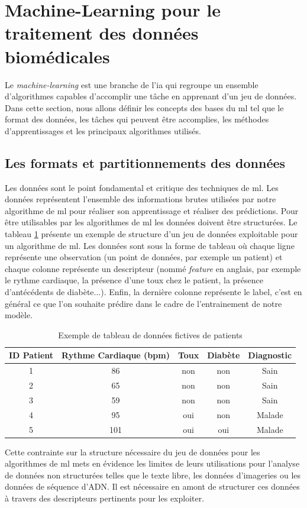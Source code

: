 \section{Machine-Learning pour le traitement des données biomédicales}
Le \textit{machine-learning} est une branche de l'\gls{ia} qui regroupe un ensemble d'algorithmes capables d'accomplir une tâche en apprenant d'un jeu de données. Dans cette section, nous allons définir les concepts des bases du \gls{ml} tel que le format des données, les tâches qui peuvent être accomplies, les méthodes d'apprentissages et les principaux algorithmes utilisés.

\subsection{Les formats et partitionnements des données}
Les données sont le point fondamental et critique des techniques de \gls{ml}. Les données représentent l'ensemble des informations brutes utilisées par notre algorithme de \gls{ml} pour réaliser son apprentissage et réaliser des prédictions. Pour être utilisables par les algorithmes de \gls{ml} les données doivent être structurées. Le tableau \ref{table:dataset_intro} présente un exemple de structure d'un jeu de données exploitable pour un algorithme de \gls{ml}. Les données sont sous la forme de tableau où chaque ligne représente une observation (un point de données, par exemple un patient) et chaque colonne représente un descripteur (nommé \textit{feature} en anglais, par exemple le rythme cardiaque, la présence d'une toux chez le patient, la présence d'antécédents de diabète...). Enfin, la dernière colonne représente le label, c'est en général ce que l'on souhaite prédire dans le cadre de l'entrainement de notre modèle.
\begin{table}[!htbp]
\centering
\begin{tabular}{|c|c|c|c|c|} 
 \hline
 ID Patient & Rythme Cardiaque (bpm) & Toux & Diabète & Diagnostic \\
 \hline
 1 & 86 & non & non & Sain \\ 
 2 & 65 & non & non & Sain \\ 
 3 & 59 & non & non & Sain \\ 
 4 & 95 & oui & non & Malade \\ 
 5 & 101 & oui & oui & Malade\\ 
 \hline
\end{tabular}
\caption{Exemple de tableau de données fictives de patients}
\label{table:dataset_intro}
\end{table}
Cette contrainte sur la structure nécessaire du jeu de données pour les algorithmes de \gls{ml} mets en évidence les limites de leurs utilisations pour l'analyse de données non structurées telles que le texte libre, les données d'imageries ou les données de séquence d'ADN. Il est nécessaire en amont de structurer ces données à travers des descripteurs pertinents pour les exploiter.

